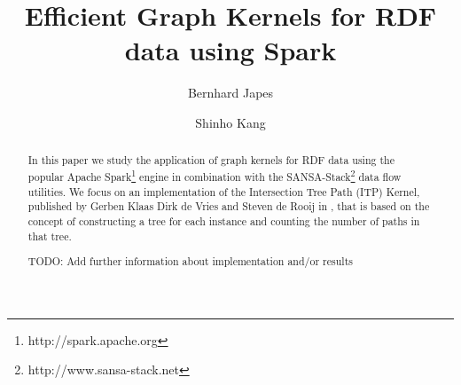 \documentclass{easychair}
\begin{document}
%
\title{Efficient Graph Kernels for RDF data using Spark}



%
\author{
Bernhard Japes
\and
Shinho Kang
}




\clearpage

\maketitle

\begin{abstract}
In this paper we study the application of graph kernels for RDF data using the popular Apache Spark\footnote{http://spark.apache.org} engine in combination with the SANSA-Stack\footnote{http://www.sansa-stack.net} data flow utilities.
We focus on an implementation of the Intersection Tree Path (ITP) Kernel, published by Gerben Klaas Dirk de Vries and Steven de Rooij in \cite{FGK}, that is based on the concept of constructing a tree for each instance and counting the number of paths in that tree.

TODO: Add further information about implementation and/or results

\end{abstract}
\end{document}
